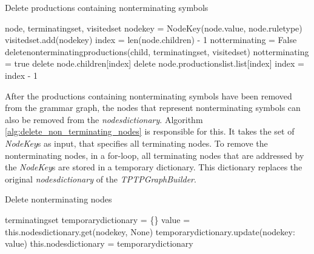 \begin{algorithm}[H]
\caption{Delete productions containing nonterminating symbols}
\begin{algorithmic}[1] 
\Require node, terminating\textunderscore set, visited\textunderscore set
\State node\textunderscore key = Node\textunderscore Key(node.value, node.rule\textunderscore type)
	\State visited\textunderscore set.add(node\textunderscore key)
	\State index = len(node.children) - 1
		\State not\textunderscore terminating = False
			\State delete\textunderscore non\textunderscore terminating\textunderscore productions(child, terminating\textunderscore set, visited\textunderscore set)
				\State not\textunderscore terminating = true
			\EndIf
		\EndFor
			\State delete node.children[index]
			\State delete node.productions\textunderscore list.list[index]
		\EndIf
		\State index = index - 1
\EndFor
\EndIf
\end{algorithmic}
\label{alg:delete_non_terminating_productions}
\end{algorithm}

After the productions containing nonterminating symbols have been removed from the grammar graph, the nodes that represent nonterminating symbols can also be removed from the \textit{nodes\textunderscore dictionary}.
Algorithm \ref{alg:delete_non_terminating_nodes} is responsible for this. It takes the set of \textit{Node\textunderscore Key}s as input, that specifies all terminating nodes.
To remove the nonterminating nodes, in a for-loop, all terminating nodes that are addressed by the \textit{Node\textunderscore Key}s are stored in a temporary dictionary. This dictionary replaces the original \textit{nodes\textunderscore dictionary} of the \textit{TPTPGraphBuilder}.
\begin{algorithm}[H]
\caption{Delete nonterminating nodes}
\begin{algorithmic}[1] 
\Require terminating\textunderscore set
\State temporary\textunderscore dictionary = \{\}
	\State value = this.nodes\textunderscore dictionary.get(node\textunderscore key, None)
	\State temporary\textunderscore dictionary.update({node\textunderscore key: value})
\EndFor
\State this.nodes\textunderscore dictionary = temporary\textunderscore dictionary
\end{algorithmic}
\label{alg:delete_non_terminating_nodes}
\end{algorithm}

